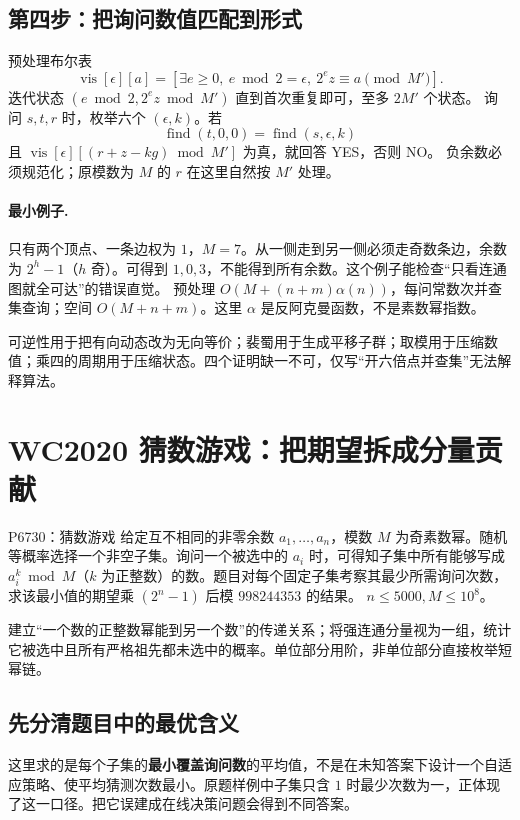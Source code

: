 \subsection{第四步：把询问数值匹配到形式}
预处理布尔表
\[
 \operatorname{vis}[\epsilon][a]=[\exists e\ge0,\ e\bmod2=\epsilon,\ 2^ez\equiv a\pmod{M'}].
\]
迭代状态 $(e\bmod2,2^ez\bmod M')$ 直到首次重复即可，至多 $2M'$ 个状态。
询问 $s,t,r$ 时，枚举六个 $(\epsilon,k)$。若
\[
\operatorname{find}(t,0,0)=\operatorname{find}(s,\epsilon,k)
\]
且 $\operatorname{vis}[\epsilon][(r+z-kg)\bmod M']$ 为真，就回答 YES，否则 NO。
负余数必须规范化；原模数为 $M$ 的 $r$ 在这里自然按 $M'$ 处理。

\paragraph{最小例子.} 只有两个顶点、一条边权为 $1$，$M=7$。从一侧走到另一侧必须走奇数条边，余数为 $2^h-1$（$h$ 奇）。可得到 $1,0,3$，不能得到所有余数。这个例子能检查“只看连通图就全可达”的错误直觉。
\cost 预处理 $O(M+(n+m)\alpha(n))$，每问常数次并查集查询；空间 $O(M+n+m)$。这里 $\alpha$ 是反阿克曼函数，不是素数幂指数。
\begin{teach}[为何这道题适合作为同余代数的结课题]
可逆性用于把有向动态改为无向等价；裴蜀用于生成平移子群；取模用于压缩数值；乘四的周期用于压缩状态。四个证明缺一不可，仅写“开六倍点并查集”无法解释算法。
\end{teach}


\section{WC2020 猜数游戏：把期望拆成分量贡献}
\begin{problem}{P6730：猜数游戏}
给定互不相同的非零余数 $a_1,\ldots,a_n$，模数 $M$ 为奇素数幂。随机等概率选择一个非空子集。询问一个被选中的 $a_i$ 时，可得知子集中所有能够写成 $a_i^k\bmod M$（$k$ 为正整数）的数。题目对每个固定子集考察其最少所需询问次数，求该最小值的期望乘 $(2^n-1)$ 后模 $998244353$ 的结果。
$n\le5000,M\le10^8$。
\end{problem}
\hint 建立“一个数的正整数幂能到另一个数”的传递关系；将强连通分量视为一组，统计它被选中且所有严格祖先都未选中的概率。单位部分用阶，非单位部分直接枚举短幂链。

\subsection{先分清题目中的最优含义}
这里求的是每个子集的\textbf{最小覆盖询问数}的平均值，不是在未知答案下设计一个自适应策略、使平均猜测次数最小。原题样例中子集只含 $1$ 时最少次数为一，正体现了这一口径。把它误建成在线决策问题会得到不同答案。

